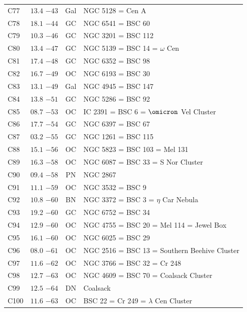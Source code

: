 \begin{table}[t]
\begin{tabularx}{\linewidth}{lccX}
C77  &$13.4$ $-43$&Gal&NGC 5128 = Cen A\\
C78  &$18.1$ $-44$&GC &NGC 6541 = BSC 60\\
C79  &$10.3$ $-46$&GC &NGC 3201 = BSC 112\\
C80  &$13.4$ $-47$&GC &NGC 5139 = BSC 14 = $\omega$ Cen\\
C81  &$17.4$ $-48$&GC &NGC 6352 = BSC 98\\
C82  &$16.7$ $-49$&OC &NGC 6193 = BSC 30\\
C83  &$13.1$ $-49$&Gal&NGC 4945 = BSC 147\\
C84  &$13.8$ $-51$&GC &NGC 5286 = BSC 92\\
C85  &$08.7$ $-53$&OC &IC 2391 = BSC 6 = $\omicron$ Vel Cluster\\
C86  &$17.7$ $-54$&GC &NGC 6397 = BSC 67\\
C87  &$03.2$ $-55$&GC &NGC 1261 = BSC 115\\
C88  &$15.1$ $-56$&OC &NGC 5823 = BSC 103 = Mel 131\\
C89  &$16.3$ $-58$&OC &NGC 6087 = BSC 33 = S Nor Cluster\\
C90  &$09.4$ $-58$&PN &NGC 2867\\
C91  &$11.1$ $-59$&OC &NGC 3532 = BSC 9\\
C92  &$10.8$ $-60$&BN &NGC 3372 = BSC 3 = $\eta$ Car Nebula\\
C93  &$19.2$ $-60$&GC &NGC 6752 = BSC 34\\
C94  &$12.9$ $-60$&OC &NGC 4755 = BSC 20 = Mel 114 = Jewel Box\\
C95  &$16.1$ $-60$&OC &NGC 6025 = BSC 29\\
C96  &$08.0$ $-61$&OC &NGC 2516 = BSC 13 = Southern Beehive Cluster\\
C97  &$11.6$ $-62$&OC &NGC 3766 = BSC 32 = Cr 248\\
C98  &$12.7$ $-63$&OC &NGC 4609 = BSC 70 = Coalsack Cluster\\
C99  &$12.5$ $-64$&DN &Coalsack\\
C100 &$11.6$ $-63$&OC &BSC 22 = Cr 249 = $\lambda$ Cen Cluster\\

        \hline
    \end{tabularx}
\end{table}
\clearpage


